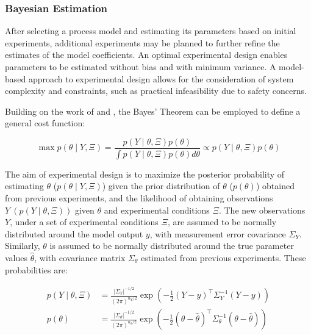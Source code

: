 \documentclass[../Article_Design_of_Experiment.tex]{subfiles}
\begin{document}
	
	\subsubsection{Bayesian Estimation}
	
	After selecting a process model and estimating its parameters based on initial experiments, additional experiments may be planned to further refine the estimates of the model coefficients. An optimal experimental design enables parameters to be estimated without bias and with minimum variance. A model-based approach to experimental design allows for the consideration of system complexity and constraints, such as practical infeasibility due to safety concerns.
	
	Building on the work of \citet{Walter2010} and \citet{Himmelblau1970}, the Bayes' Theorem can be employed to define a general cost function:
	
	{\footnotesize
		\begin{equation}
			\max p\left(\theta \mid Y, \Xi \right) = \frac{p\left(Y \mid \theta, \Xi\right) p\left(\theta\right)}{\int p\left(Y \mid \theta, \Xi\right) p\left(\theta\right) d\theta} \propto p\left(Y \mid \theta, \Xi\right) p\left(\theta\right)
		\end{equation}
	}
	
	The aim of experimental design is to maximize the posterior probability of estimating $\theta$ ($p\left(\theta \mid Y, \Xi \right)$) given the prior distribution of $\theta$ ($p(\theta)$) obtained from previous experiments, and the likelihood of obtaining observations $Y~\left(p\left(Y \mid \theta, \Xi\right)\right)$ given $\theta$ and experimental conditions $\Xi$. The new observations $Y$, under a set of experimental conditions $\Xi$, are assumed to be normally distributed around the model output $y$, with measurement error covariance $\Sigma_Y$. Similarly, $\theta$ is assumed to be normally distributed around the true parameter values $\hat{\theta}$, with covariance matrix $\Sigma_\theta$ estimated from previous experiments. These probabilities are:
	
	{\footnotesize
		\begin{align} 
			p\left(Y \mid \theta, \Xi \right) &= \frac{|\Sigma_Y|^{-1/2}}{\left(2\pi\right)^{n_Y/2}} \exp\left( -\frac{1}{2} \left(Y - y\right)^\top \Sigma_Y^{-1} \left(Y - y\right) \right) \\
			p\left(\theta\right) &= \frac{|\Sigma_\theta|^{-1/2}}{\left(2\pi\right)^{n_\theta/2}} \exp\left( -\frac{1}{2} \left(\theta - \hat{\theta}\right)^\top \Sigma_\theta^{-1} \left(\theta - \hat{\theta}\right) \right)
		\end{align}
	}
	
\end{document}
